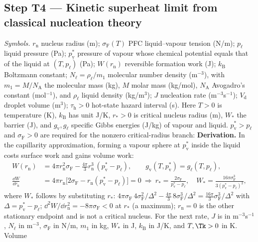 \subsection{Step T4 --- Kinetic superheat limit from classical nucleation theory}\label{sec:cnt}
\emph{Symbols.} $r_{\mathrm n}$ nucleus radius (m); $\sigma_{\mathrm F}(T)$ PFC liquid--vapour tension (N/m);
$p_\ell$ liquid pressure (Pa); $p_{\mathrm v}^*$ pressure of vapour whose chemical potential equals that of the
liquid at $(T,p_\ell)$ (Pa); $W(r_{\mathrm n})$ reversible formation work (J); $k_{\mathrm B}$ Boltzmann constant;
$N_\ell=\rho_\ell/m_1$ molecular number density (m$^{-3}$), with $m_1=M/N_{\mathrm A}$ the molecular
mass (kg), $M$ molar mass (kg/mol), $N_{\mathrm A}$ Avogadro's constant (mol$^{-1}$), and $\rho_\ell$
liquid density (kg/m$^3$); $J$ nucleation rate (m$^{-3}$s$^{-1}$); $V_{\mathrm d}$ droplet volume
(m$^3$); $\tau_{\mathrm h}>0$ hot-state hazard interval (s). Here $T>0$ is temperature (K),
$k_{\mathrm B}$ has unit J/K, $r_*>0$ is critical nucleus radius (m), $W_*$ the barrier (J), and
$g_{\mathrm v},g_\ell$ specific Gibbs energies (J/kg) of vapour and liquid.
$p_{\mathrm v}^*>p_\ell$ and $\sigma_{\mathrm F}>0$ are required for the nonzero critical-radius branch:
\textbf{Derivation.} In the capillarity approximation, forming a vapour sphere at $p_{\mathrm v}^*$ inside
the liquid costs surface work and gains volume work:
\begin{align}
W(r_{\mathrm n})&=4\pi r_{\mathrm n}^2\sigma_{\mathrm F}-\tfrac{4\pi}{3}r_{\mathrm n}^3\,(p_{\mathrm v}^*-p_\ell),\qquad
g_{\mathrm v}(T,p_{\mathrm v}^*)=g_\ell(T,p_\ell),\label{eq:Wn}\\
\frac{\dd W}{\dd r_{\mathrm n}}&=4\pi r_{\mathrm n}\bigl[2\sigma_{\mathrm F}-r_{\mathrm n}(p_{\mathrm v}^*-p_\ell)\bigr]=0
\ \Rightarrow\ r_*=\frac{2\sigma_{\mathrm F}}{p_{\mathrm v}^*-p_\ell},\quad
W_*=\frac{16\pi\sigma_{\mathrm F}^3}{3(p_{\mathrm v}^*-p_\ell)^2},\label{eq:Wstar}
\end{align}
where $W_*$ follows by substituting $r_*$: $4\pi\sigma_{\mathrm F}\,4\sigma_{\mathrm F}^2/\Delta^2-\frac{4\pi}{3}\,8\sigma_{\mathrm F}^3/\Delta^2
=\frac{16\pi}{3}\sigma_{\mathrm F}^3/\Delta^2$ with $\Delta=p_{\mathrm v}^*-p_\ell$; $\dd^2W/\dd r_{\mathrm n}^2=-8\pi\sigma_{\mathrm F}<0$ at $r_*$
(a maximum); $r_{\mathrm n}=0$ is the other stationary endpoint and is not a critical nucleus.
For the next rate, $J$ is in m$^{-3}$s$^{-1}$, $N_\ell$ in m$^{-3}$, $\sigma_{\mathrm F}$ in
N/m, $m_1$ in kg, $W_*$ in J, $k_{\mathrm B}$ in J/K, and $T,\Tk>0$ in K. Volume
